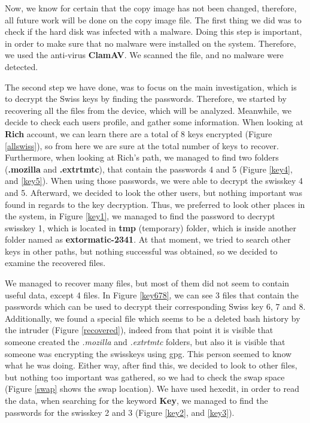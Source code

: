 \documentclass[a4paper,12pt]{article}
\begin{document}
Now, we know for certain that the copy image has not been changed, therefore, all future work will be done on the copy image file. 
The first thing we did was to check if the hard disk was infected with a malware. Doing this step is important, in order to make sure that no malware were installed on the system. Therefore, we used the anti-virus \textbf{ClamAV}. We scanned the file, and no malware were detected.

The second step we have done, was to focus on the main investigation, which is to decrypt the Swiss keys by finding the passwords. Therefore, we started by recovering all the files from the device, which will be analyzed. Meanwhile, we decide to check each users profile, and gather some information. When looking at \textbf{Rich} account, we can learn there are a total of 8 keys encrypted (Figure \ref{allswiss}), so from here we are sure at the total number of keys to recover. Furthermore, when looking at Rich's path, we managed to find two folders (\textbf{.mozilla} and \textbf{.extrtmtc}), that contain the passwords 4 and 5 (Figure \ref{key4}, and \ref{key5}). When using those passwords, we were able to decrypt the swisskey 4 and 5. Afterward, we decided to look the other users, but nothing important was found in regards to the key decryption. Thus, we preferred to look other places in the system, in Figure \ref{key1}, we managed to find the password to decrypt swisskey 1, which is located in \textbf{tmp} (temporary) folder, which is inside another folder named as \textbf{extormatic-2341}. At that moment, we tried to search other keys in other paths, but nothing successful was obtained, so we decided to examine the recovered files. 

We managed to recover many files, but most of them did not seem to contain useful data, except 4 files. In Figure \ref{key678}, we can see 3 files that contain the passwords which can be used to decrypt their corresponding Swiss key 6, 7 and 8. Additionally, we found a special file which seems to be a deleted bash history by the intruder (Figure \ref{recovered}), indeed from that point it is visible that someone created the \textit{.mozilla} and \textit{.extrtmtc} folders, but also it is visible that someone was encrypting the swisskeys using gpg. This person seemed to know what he was doing. Either way, after find this, we decided to look to other files, but nothing too important was gathered, so we had to check the swap space (Figure \ref{swap} shows the swap location). We have used hexedit, in order to read the data, when searching for the keyword \textbf{Key}, we managed to find the passwords for the swisskey 2 and 3 (Figure \ref{key2}, and \ref{key3}). 
\end{document}
